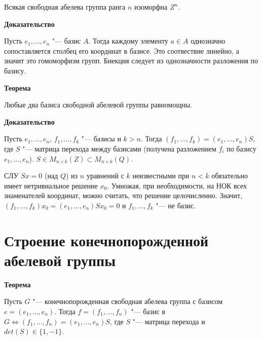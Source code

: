\documentclass{article}
\begin{document}
Всякая свободная абелева группа ранга $n$ изоморфна $Z^n$.

\vspace{5pt}

\textbf{Доказательство}

Пусть $e_1, ..., e_n$ "--- базис $A$. Тогда каждому элементу $a \in A$ однозначно сопоставляется столбец его координат в базисе. Это соотвествие линейно, а значит это гомоморфизм групп. Биекция следует из однозначности разложения по базису.

\vspace{10pt}

\textbf{Теорема}

Любые два базиса свободной абелевой группы равномощны.

\vspace{5pt}

\textbf{Доказательство}

Пусть $e_1, ... , e_n$, $f_1, ..., f_k$ "--- базисы и $k > n$. Тогда $(f_1, ..., f_k) = (e_1, ..., e_n)S$, где $S$ "--- матрица перехода между базисами (получена разложением $f_i$ по базису $e_1, ..., e_n$). $S \in M_{n \times k}(Z) \subset M_{n \times k}(Q)$. 

СЛУ $Sx = 0$ (над $Q$) из $n$ уравнений с $k$ неизвестными при $n < k$ обязательно имеет нетривиальное решение $x_0$. Умножая, при необходимости, на НОК всех знаменателей координат, можно считать, что решение целочисленно. Значит, $(f_1, ..., f_k)x_0 = (e_1, ..., e_n)Sx_0 = 0$ и $f_1,..., f_k$ "--- не базис.

\section{Строение конечнопорожденной абелевой группы}

\textbf{Теорема}

Пусть $G$ "--- конечнопорожденная свободная абелева группа с базисом $e = (e_1, ..., e_n)$. Тогда $f = (f_1, ..., f_n)$ "--- базис в $G \Leftrightarrow (f_1, ..., f_n) = (e_1, ..., e_n)S$, где $S$ "--- матрица перехода и $det(S) \in \{1, -1\}$.

\vspace{5pt}
\end{document}
